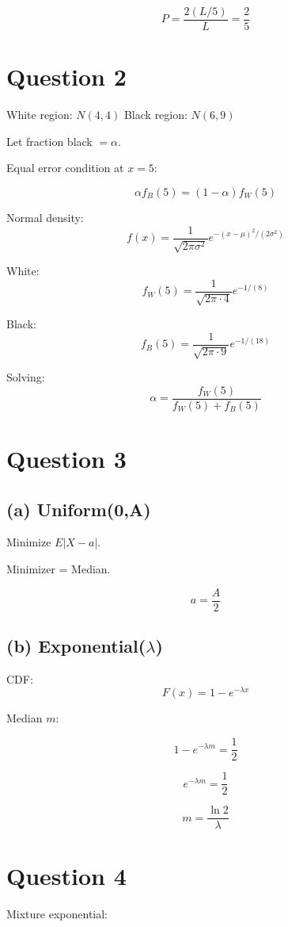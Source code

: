 \documentclass[12pt]{article}
\begin{document}
\[
P = \frac{2(L/5)}{L} = \boxed{\frac{2}{5}}
\]

\newpage

\section*{Question 2}

White region: $N(4,4)$  
Black region: $N(6,9)$  

Let fraction black $= \alpha$.

Equal error condition at $x=5$:

\[
\alpha f_B(5) = (1-\alpha) f_W(5)
\]

Normal density:
\[
f(x)=\frac{1}{\sqrt{2\pi\sigma^2}} e^{-(x-\mu)^2/(2\sigma^2)}
\]

White:
\[
f_W(5)=\frac{1}{\sqrt{2\pi \cdot 4}} e^{-1/(8)}
\]

Black:
\[
f_B(5)=\frac{1}{\sqrt{2\pi \cdot 9}} e^{-1/(18)}
\]

Solving:
\[
\alpha = \frac{f_W(5)}{f_W(5)+f_B(5)}
\]

\section*{Question 3}

\subsection*{(a) Uniform(0,A)}

Minimize $E|X-a|$.

Minimizer = Median.

\[
\boxed{a = \frac{A}{2}}
\]

\subsection*{(b) Exponential($\lambda$)}

CDF:
\[
F(x)=1-e^{-\lambda x}
\]

Median $m$:

\[
1-e^{-\lambda m}=\frac12
\]

\[
e^{-\lambda m}=\frac12
\]

\[
\boxed{m=\frac{\ln 2}{\lambda}}
\]

\section*{Question 4}

Mixture exponential:
\end{document}
